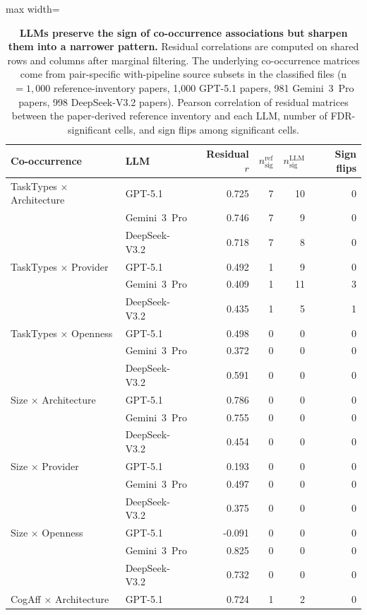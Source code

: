 \begin{table}[H]
\centering
\caption{\textbf{LLMs preserve the sign of co-occurrence associations but sharpen them into a narrower pattern.} Residual correlations are computed on shared rows and columns after marginal filtering. The underlying co-occurrence matrices come from pair-specific with-pipeline source subsets in the classified files (n$=1{,}000$ reference-inventory papers, 1{,}000 GPT-5.1 papers, 981 Gemini~3~Pro papers, 998 DeepSeek-V3.2 papers). Pearson correlation of residual matrices between the paper-derived reference inventory and each LLM, number of FDR-significant cells, and sign flips among significant cells.}
\label{tab:residual_summary}
\begin{adjustbox}{max width=\textwidth}
\begin{tabular}{llrrrr}
\toprule
Co-occurrence & LLM & Residual $r$ & $n_{\mathrm{sig}}^{\mathrm{ref}}$ & $n_{\mathrm{sig}}^{\mathrm{LLM}}$ & Sign flips \\
\midrule
TaskTypes × Architecture & GPT-5.1 & 0.725 & 7 & 10 & 0 \\
 & Gemini~3~Pro & 0.746 & 7 & 9 & 0 \\
 & DeepSeek-V3.2 & 0.718 & 7 & 8 & 0 \\
TaskTypes × Provider & GPT-5.1 & 0.492 & 1 & 9 & 0 \\
 & Gemini~3~Pro & 0.409 & 1 & 11 & 3 \\
 & DeepSeek-V3.2 & 0.435 & 1 & 5 & 1 \\
TaskTypes × Openness & GPT-5.1 & 0.498 & 0 & 0 & 0 \\
 & Gemini~3~Pro & 0.372 & 0 & 0 & 0 \\
 & DeepSeek-V3.2 & 0.591 & 0 & 0 & 0 \\
Size × Architecture & GPT-5.1 & 0.786 & 0 & 0 & 0 \\
 & Gemini~3~Pro & 0.755 & 0 & 0 & 0 \\
 & DeepSeek-V3.2 & 0.454 & 0 & 0 & 0 \\
Size × Provider & GPT-5.1 & 0.193 & 0 & 0 & 0 \\
 & Gemini~3~Pro & 0.497 & 0 & 0 & 0 \\
 & DeepSeek-V3.2 & 0.375 & 0 & 0 & 0 \\
Size × Openness & GPT-5.1 & -0.091 & 0 & 0 & 0 \\
 & Gemini~3~Pro & 0.825 & 0 & 0 & 0 \\
 & DeepSeek-V3.2 & 0.732 & 0 & 0 & 0 \\
CogAff × Architecture & GPT-5.1 & 0.724 & 1 & 2 & 0 \\

\end{tabular}
\end{adjustbox}
\end{table}
